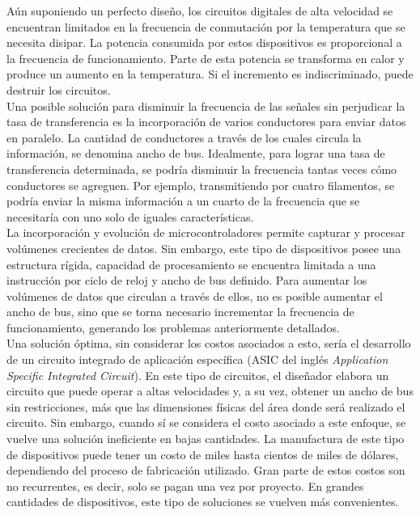 Aún suponiendo un perfecto diseño, los circuitos digitales de alta velocidad se encuentran limitados en la frecuencia de conmutación por la temperatura que se necesita disipar. La potencia consumida por estos dispositivos es proporcional a la frecuencia de funcionamiento\cite{Wakerly1999}. Parte de esta potencia se transforma en calor y produce un aumento en la temperatura. Si el incremento es indiscriminado, puede destruir los circuitos.\\

Una posible solución para disminuir la frecuencia de las señales sin perjudicar la tasa de transferencia es la incorporación de varios conductores para enviar datos en paralelo.
La cantidad de conductores a través de los cuales circula la información, se denomina ancho de bus. Idealmente, para lograr una tasa de transferencia determinada, se podría disminuir la frecuencia tantas veces cómo conductores se agreguen. Por ejemplo, transmitiendo por cuatro filamentos, se podría enviar la misma información a un cuarto de la frecuencia que se necesitaría con uno solo de iguales características.\\

La incorporación y evolución de microcontroladores permite capturar y procesar volúmenes crecientes de datos. Sin embargo, este tipo de dispositivos posee una estructura rígida, capacidad de procesamiento se encuentra limitada a una instrucción por ciclo de reloj y ancho de bus definido. Para aumentar los volúmenes de datos que circulan a través de ellos, no es posible aumentar el ancho de bus, sino que se torna necesario incrementar la frecuencia de funcionamiento, generando los problemas anteriormente detallados.\\

Una solución óptima, sin considerar los costos asociados a esto, sería el desarrollo de un circuito integrado de aplicación específica (ASIC del inglés {\it Application Specific Integrated Circuit}). En este tipo de circuitos, el diseñador elabora un circuito que puede operar a altas velocidades y, a su vez, obtener un ancho de bus sin restricciones, más que las dimensiones físicas del área donde será realizado el circuito. Sin embargo, cuando sí se considera el costo asociado a este enfoque, se vuelve una solución ineficiente en bajas cantidades. La manufactura de este tipo de dispositivos puede tener un costo de miles hasta cientos de miles de dólares, dependiendo del proceso de fabricación utilizado. Gran parte de estos costos son no recurrentes, es decir, solo se pagan una vez por proyecto. En grandes cantidades de dispositivos, este tipo de soluciones se vuelven más convenientes.\\

